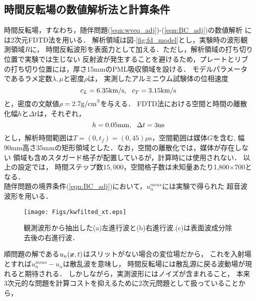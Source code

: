 \subsection{時間反転場の数値解析法と計算条件}
時間反転場，すなわち，随伴問題(\ref{eqn:wveq_adj})-(\ref{eqn:BC_adj})の数値解析
には2次元FDTD法\cite{Fellinger1995, FDTD_KK}を用いる．
解析領域は図-\ref{fig:fd_model}とし，実験時の波形観測領域$R$に，
時間反転波形を表面力として加える．ただし，解析領域の打ち切り位置で実験では生じない
反射波が発生することを避けるため，プレートとリブの打ち切り位置には，厚さ15mmのPML吸収領域を設ける．
モデルパラメータであるラメ定数$\lambda,\mu$と密度$\rho$は，
実測したアルミニウム試験体の位相速度
\begin{equation}
	c_L=6.35{\rm km/s}, \ \ c_T=3.15{\rm km/s}
	\label{eqn:phase_vels}
\end{equation}
と，密度の文献値$\rho=2.7{\rm g/cm}^3$を与える．
FDTD法における空間と時間の離散化幅$h$と$\Delta t$は，それぞれ，
\begin{equation}
	h=0.05{\rm mm}, \ \ \Delta t=3{\rm ns}
	\label{eqn:}
\end{equation}
とし，解析時間範囲は$T=(0,t_f)=(0,45)\mu$s，空間範囲は媒体$G$を含む,
幅90mm高さ35mmの矩形領域とした．なお，空間の離散化では，媒体が存在しない
領域も含めスタガード格子が配置しているが，計算時には使用されない．
以上の設定では，
時間ステップ数$15,000$，空間格子数は未知量あたり1,800$\times$700となる．
%
%
\\
\hspace{\parindent}
随伴問題の境界条件(\ref{eqn:BC_adj})において，$u_n^{meas}$には実験で得られた
超音波波形を用いる．
\begin{figure}[thb]
\centering
	\texttt{[image: Figs/kwfilted\_xt.eps]}
	\caption{観測波形から抽出した(a)左進行波と(b)右進行波.(c)は表面波成分除去後の右進行波．}
	\label{fig:kwfilted_xt}
\end{figure}
順問題の解である$u_n(\boldsymbol{x},t)$はスリットがない場合の変位場だから，
これを入射場とすれば$u_n^{meas}-u_n$は散乱波を意味し，
時間反転場には散乱源に戻る波動場が現れると期待される．
%
しかしながら，実測波形にはノイズが含まれること，
本来3次元的な問題を計算コストを抑えるために2次元問題として扱っていることから，
